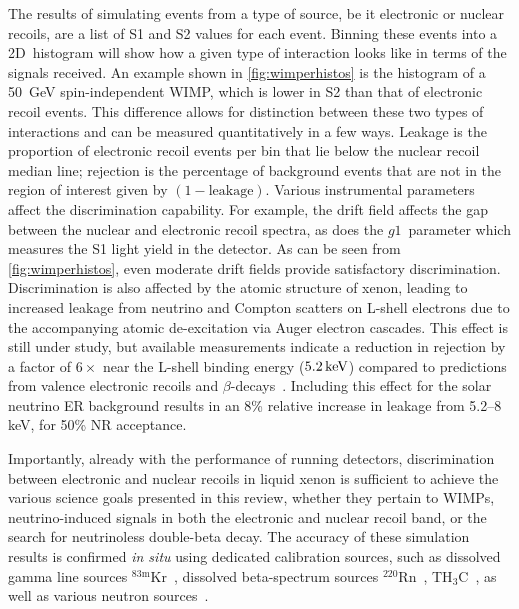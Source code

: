 The results of simulating events from a type of source, be it electronic or nuclear recoils, are a list of S1 and S2 values for each event. Binning these events into a 2D~histogram will show how a given type of interaction looks like in terms of the signals received. An example shown in \autoref{fig:wimperhistos} is the histogram of a 50~GeV spin-independent WIMP, which is lower in S2 than that of electronic recoil events. This difference allows for distinction between these two types of interactions and can be measured quantitatively in a few ways. Leakage is the proportion of electronic recoil events per bin that lie below the nuclear recoil median line; rejection is the percentage of background events that are not in the region of interest given by $(1-\mathrm{leakage})$. Various instrumental parameters affect the discrimination capability. For example, the drift field affects the gap between the nuclear and electronic recoil spectra, as does the $g1$~parameter which measures the S1 light yield in the detector. As can be seen from \autoref{fig:wimperhistos}, even moderate drift fields provide satisfactory discrimination. Discrimination is also affected by the atomic structure of xenon, leading to increased leakage from neutrino and Compton scatters on L-shell electrons due to the accompanying atomic de-excitation via Auger electron cascades. This effect is still under study, but available measurements indicate a reduction in rejection by a factor of $6\times$ near the L-shell binding energy ($5.2\, \mathrm{keV}$) compared to predictions from valence electronic recoils and $\beta$-decays~\cite{Temples:2019taup, Temples:2021prd}. Including this effect for the solar neutrino ER background results in an 8\% relative increase in leakage from 5.2--8 keV, for 50\% NR acceptance.

Importantly, already with the performance of running detectors, discrimination between electronic and nuclear recoils in liquid xenon is sufficient to achieve the various science goals presented in this review, whether they pertain to WIMPs, neutrino-induced signals in both the electronic and nuclear recoil band, or the search for neutrinoless double-beta decay. The accuracy of these simulation results is confirmed \textit{in situ} using dedicated calibration sources, such as dissolved gamma line sources ${}^{83\mathrm{m}}$Kr~\cite{Kastens:2009pa}, dissolved beta-spectrum sources ${}^{220}$Rn~\cite{Lang:2016zde,Aprile:2016pmc}, TH$_3$C~\cite{Akerib:2015wdi}, as well as various neutron sources~\cite{Collar:2013xva,Aprile:2013teh,Akerib:2016mzi}.


